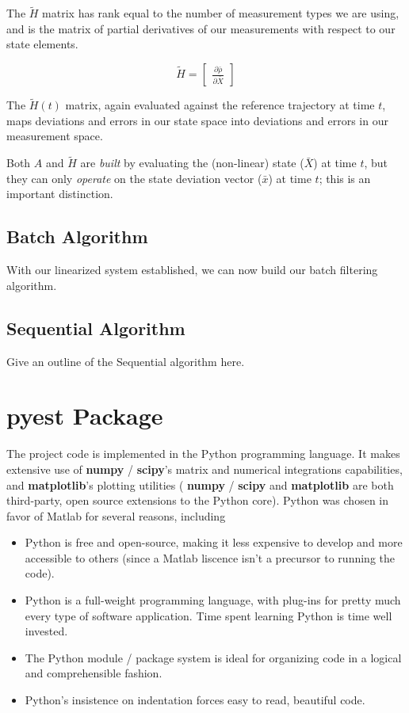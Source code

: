 \documentclass[10pt]{article}
\begin{document}
The $\tilde{H}$ matrix has rank equal to the number of measurement types we are using, and is the matrix of partial derivatives of our measurements with respect to our state elements.

\begin{equation}
\tilde{H} = 
    \begin{bmatrix} 
     \frac{\partial\bar{\rho}}{\partial\bar{X}}      
     \end{bmatrix} 
\end{equation}

The $\tilde{H}(t)$ matrix, again evaluated against the reference trajectory at time $t$, maps deviations and errors in our state space into deviations and errors in our measurement space. 

Both $A$ and $\tilde{H}$ are \emph{built} by evaluating the (non-linear) state ($\bar{X}$) at time $t$, but they can only \emph{operate} on the state deviation vector ($\bar{x}$) at time $t$; this is an important distinction.

\subsection{Batch Algorithm}

With our linearized system established, we can now build our batch filtering algorithm.

\subsection{Sequential Algorithm}
Give an outline of the Sequential algorithm here.

\section{\textbf{pyest} Package}

The project code is implemented in the Python programming language. It makes extensive use of \textbf{numpy} / \textbf{scipy}'s matrix and numerical integrations capabilities, and \textbf{matplotlib}'s plotting utilities ( \textbf{numpy} / \textbf{scipy} and \textbf{matplotlib} are both third-party, open source extensions to the Python core). 
Python was chosen in favor of Matlab for several reasons, including

\begin{itemize}
\item Python is free and open-source, making it less expensive to develop and more accessible to others (since a Matlab liscence isn't a precursor to running the code).
\item Python is a full-weight programming language, with plug-ins for pretty much every type of software application. Time spent learning Python is time well invested. 
\item The Python module / package system is ideal for organizing code in a logical and comprehensible fashion.
\item Python's insistence on indentation forces easy to read, beautiful code.
\end{itemize}
\end{document}

